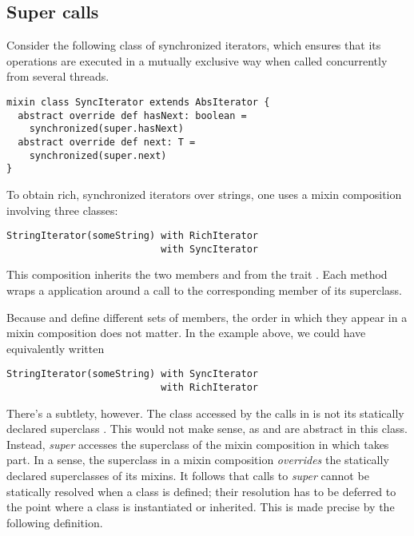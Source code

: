 \documentclass[a4paper,11pt,twoside]{article}
\begin{document}
\subsection*{Super calls}
Consider the following class of synchronized iterators, which ensures
that its operations are executed in a mutually exclusive way when
called concurrently from several threads.
\begin{lstlisting}
mixin class SyncIterator extends AbsIterator {
  abstract override def hasNext: boolean = 
    synchronized(super.hasNext)
  abstract override def next: T = 
    synchronized(super.next)
}
\end{lstlisting}
To obtain rich, synchronized iterators over strings, one uses a mixin
composition involving three classes:
\begin{lstlisting}
StringIterator(someString) with RichIterator 
                           with SyncIterator
\end{lstlisting}
This composition inherits the two members \lstinline@hasNext@ and
\lstinline@next@ from the trait \lstinline@SyncIterator@.  Each
method wraps a \lstinline@synchronized@ application around a call to
the corresponding member of its superclass. 

Because \lstinline@RichIterator@ and \lstinline@StringIterator@ define
different sets of members, the order in which they appear in a mixin
composition does not matter.
In the example above, we could have equivalently written
\begin{lstlisting}
StringIterator(someString) with SyncIterator 
                           with RichIterator
\end{lstlisting}
There's a subtlety, however.  The class accessed by the
 calls in \lstinline@SyncIterator@ is not its
statically declared superclass \lstinline@AbsIterator@. This would not
make sense, as \lstinline@hasNext@ and \lstinline@next@ are abstract
in this class.  Instead, {\em super} accesses the superclass
\lstinline@StringIterator@ of the mixin composition in which
\lstinline@SyncIterator@ takes part. In a sense, the superclass in a
mixin composition {\em overrides} the statically declared superclasses
of its mixins. It follows that calls to {\em super} cannot be
statically resolved when a class is defined; their resolution has to
be deferred to the point where a class is instantiated or inherited.
This is made precise by the following definition.
\end{document}
